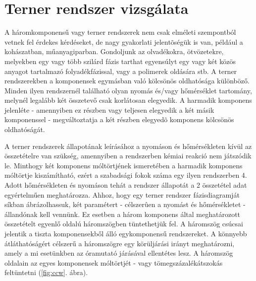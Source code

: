 \documentclass{article}
\begin{document}
\section{Terner rendszer vizsgálata}
A háromkomponensű vagy terner rendszerek nem csak elméleti szempontból vetnek fel érdekes kérdéseket, de nagy gyakorlati jelentõségük is van, például a kohászatban, műanyagiparban.
Gondoljunk az olvadékokra, ötvözetekre, melyekben egy vagy több szilárd fázis tarthat egyensúlyt egy vagy két közös anyagot tartalmazó folyadékfázissal, vagy a polimerek oldására stb.
A terner rendszerekben a komponensek egymásban való kölcsönös oldhatósága különböző.
Minden ilyen rendszernél található olyan nyomás és/vagy hőmérséklet tartomány, melynél legalább két összetevő csak korlátosan elegyedik.
A harmadik komponens jelenléte - amennyiben ez részben vagy teljesen elegyedik a két másik komponenssel - megváltoztatja a két részben elegyedõ komponens kölcsönös oldhatóságát.

A terner rendszerek állapotának leírásához a nyomáson és hőmérsékleten kívül az összetételre van szükség, amennyiben a rendszerben kémiai reakció nem játszódik le.
Minthogy két komponens móltörtjének ismeretében a harmadik komponens móltörtje kiszámítható, ezért a szabadsági fokok száma egy ilyen rendszerben 4.
Adott hőmérsékleten és nyomáson tehát a rendszer állapotát a 2 összetétel adat egyértelműen meghatározza.
Ahhoz, hogy egy terner rendszer fázisdiagramját síkban ábrázolhassuk, két paramétert - célszerûen a nyomást és hőmérsékletet - állandónak kell vennünk.
Ez esetben a három komponens által meghatározott összetételt egyenlő oldalú háromszögben tüntethetjük fel.
A háromszög csúcsai jelentik a tiszta komponensekből álló egykomponensű rendszereket.
A könnyebb átláthatóságért célszerű a háromszögre egy körüljárási irányt meghatározni, amely a mi esetünkben az óramutató járásával ellentétes lesz. A háromszög oldalain az egyes komponensek móltörtjét - vagy tömegszázalékátszokás feltüntetni (\ref{fig:ccw}. ábra).
\end{document}
